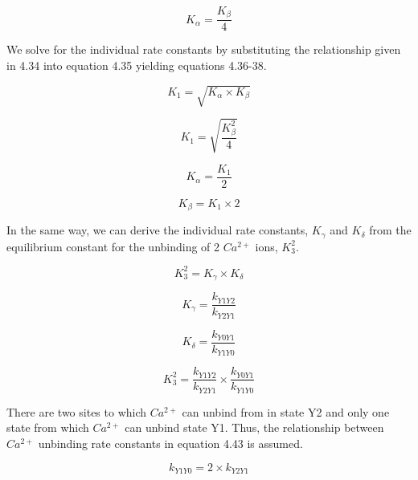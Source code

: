 \documentclass[12pt]{ucsddissertation}
\begin{document}
\begin{equation}
K_{\alpha}= \frac{K_{\beta}}{4}
\end{equation}

We solve for the individual rate constants by substituting the relationship given in 4.34 into equation 4.35 yielding equations 4.36-38. 


\begin{equation}
K_{1}= \sqrt{K_{\alpha} \times K_{\beta}}
\end{equation}


\begin{equation}
K_{1}= \sqrt{ \frac{K_{\beta}^2}{4}}
\end{equation}

\begin{equation}
K_{\alpha}= \frac{K_{1}}{2} 
\end{equation}

\begin{equation}
K_{\beta}= K_{1} \times 2
\end{equation}



In the same way, we can derive the individual rate constants, $K_{\gamma}$ and $K_{\delta}$ from the equilibrium constant for the unbinding of 2 $Ca^{2+}$ ions, $K_{3}^{2}$.  

\begin{equation}
K_{3}^{2}= K_{\gamma} \times K_{\delta}
\end{equation}

\begin{equation}
K_{\gamma} = \frac{k_{Y1Y2}}{k_{Y2Y1}} 
\end{equation}

\begin{equation}
K_{\delta} = \frac{k_{Y0Y1}}{k_{Y1Y0}}
\end{equation}

\begin{equation}
K^{2}_{3}=   \frac{k_{Y1Y2}}{k_{Y2Y1}} \times \frac{k_{Y0Y1}}{k_{Y1Y0}}
\end{equation}

There are two sites to which  $Ca^{2+}$ can unbind from in state Y2 and only one state from which $Ca^{2+}$ can unbind state Y1. Thus, the relationship between $Ca^{2+}$ unbinding rate constants in equation 4.43 is assumed. 

\begin{equation}
k_{Y1Y0}=2 \times k_{Y2Y1} 
\end{equation}
\end{document}
